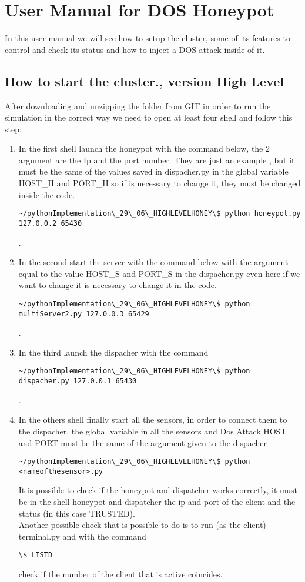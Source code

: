 \chapter{User Manual for DOS Honeypot}
\label{usermanual}
In this user manual we will see how to setup the cluster, some of its features to control and check its status and how to inject a DOS attack inside of it.
\section{How to start the cluster., version High Level}
After downloading and unzipping the folder from GIT in order to run the simulation in the correct way we need to open at least four shell and follow this step:
\begin{enumerate}
\item  In the first shell launch the honeypot  with the command below, the 2 argument are the Ip and the port number. They are just an example , but it must be the same of the values saved in dispacher.py in the global variable HOST\_H and PORT\_H  so if is necessary to change it, they must be changed inside the code. \begin{verbatim}~/pythonImplementation\_29\_06\_HIGHLEVELHONEY\$ python honeypot.py 127.0.0.2 65430\end{verbatim}. 
\item In the second start the server with the command below with the argument equal to the value HOST\_S and PORT\_S in the dispacher.py even here if we want to change it is necessary to change it in the code.  \begin{verbatim}~/pythonImplementation\_29\_06\_HIGHLEVELHONEY\$ python multiServer2.py 127.0.0.3 65429\end{verbatim}.
\item In the third launch the dispacher with the command  \begin{verbatim}~/pythonImplementation\_29\_06\_HIGHLEVELHONEY\$ python dispacher.py 127.0.0.1 65430\end{verbatim}. 
\item In the others shell finally start all the sensors, in order to connect them to the dispacher, the global variable in all the sensors and Dos Attack HOST and PORT must be the same of the argument given to the dispacher  \begin{verbatim}~/pythonImplementation\_29\_06\_HIGHLEVELHONEY\$ python <nameofthesensor>.py\end{verbatim}
It is possible to check if the honeypot and dispatcher works correctly, it must be in the shell honeypot and dispatcher the ip and port of the client and the status (in this case TRUSTED).\\
Another possible check that is possible to do is to run (as the client) terminal.py and with the command \begin{verbatim}\$ LISTD\end{verbatim} check if the number of the client that is active coincides.
\end{enumerate}

